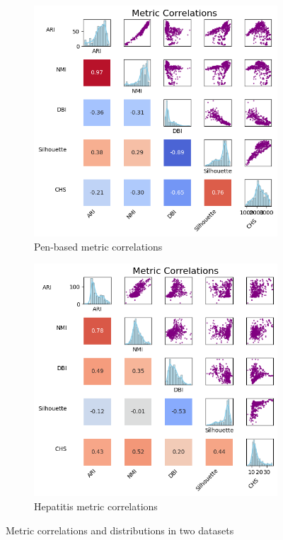 \begin{figure}[h!]
    \centering
    \begin{subfigure}{0.49\textwidth}
        \centering
        \includegraphics[width=\linewidth]{figures/KMeans/penbased_metrics_correlations_matrix.png}
        \caption{Pen-based metric correlations}
    \end{subfigure}
    \hfill
    \begin{subfigure}{0.49\textwidth}
        \centering
        \includegraphics[width=\linewidth]{figures/KMeans/hepatitis_metrics_correlations_matrix.png}
        \caption{Hepatitis metric correlations}
    \end{subfigure}
    \caption{Metric correlations and distributions in two datasets}
    \label{fig:metrics_corr}
\end{figure}


